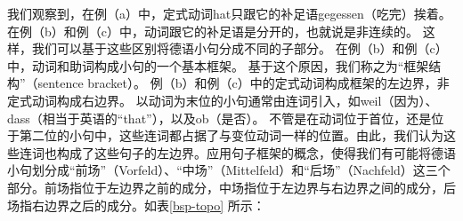 我们观察到，在例（a）中，定式动词hat只跟它的补足语gegessen（吃完）挨着。在例（b）和例（c）中，动词跟它的补足语是分开的，也就说是非连续的。
这样，我们可以基于这些区别将德语小句分成不同的子部分。
在例（b）和例（c）中，动词和助词构成小句的一个基本框架。
基于这个原因，我们称之为“框架结构”（sentence bracket）。
例（b）和例（c）中的定式动词构成框架的左边界，非定式动词构成右边界。
以动词为末位的小句通常由连词引入，如weil（因为）、dass（相当于英语的“that”），以及ob（是否）。
不管是在动词位于首位，还是位于第二位的小句中，这些连词都占据了与变位动词一样的位置。由此，我们认为这些连词也构成了这些句子的左边界。应用句子框架的概念，使得我们有可能将德语小句划分成“前场”（Vorfeld）、“中场”（Mittelfeld）和“后场”（Nachfeld）这三个部分。前场指位于左边界之前的成分，中场指位于左边界与右边界之间的成分，后场指右边界之后的成分。如表\vref{bsp-topo} 所示：
%
